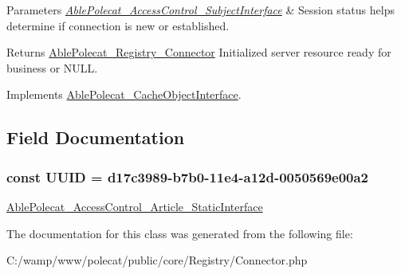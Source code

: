 \begin{DoxyParams}{Parameters}
{\em \hyperlink{interface_able_polecat___access_control___subject_interface}{Able\+Polecat\+\_\+\+Access\+Control\+\_\+\+Subject\+Interface}} & Session status helps determine if connection is new or established.\\
\hline
\end{DoxyParams}
\begin{DoxyReturn}{Returns}
\hyperlink{class_able_polecat___registry___connector}{Able\+Polecat\+\_\+\+Registry\+\_\+\+Connector} Initialized server resource ready for business or N\+U\+L\+L. 
\end{DoxyReturn}


Implements \hyperlink{interface_able_polecat___cache_object_interface_a3f2135f6ad45f51d075657f6d20db2cd}{Able\+Polecat\+\_\+\+Cache\+Object\+Interface}.



\subsection{Field Documentation}
\hypertarget{class_able_polecat___registry___connector_a74b892c8c0b86bf9d04c5819898c51e7}{}
\subsubsection[{U\+U\+I\+D}]{\setlength{\rightskip}{0pt plus 5cm}const U\+U\+I\+D = \textquotesingle{}d17c3989-\/b7b0-\/11e4-\/a12d-\/0050569e00a2\textquotesingle{}}\label{class_able_polecat___registry___connector_a74b892c8c0b86bf9d04c5819898c51e7}
\hyperlink{interface_able_polecat___access_control___article___static_interface}{Able\+Polecat\+\_\+\+Access\+Control\+\_\+\+Article\+\_\+\+Static\+Interface} 

The documentation for this class was generated from the following file\+:\begin{DoxyCompactItemize}
\item 
C\+:/wamp/www/polecat/public/core/\+Registry/Connector.\+php\end{DoxyCompactItemize}
